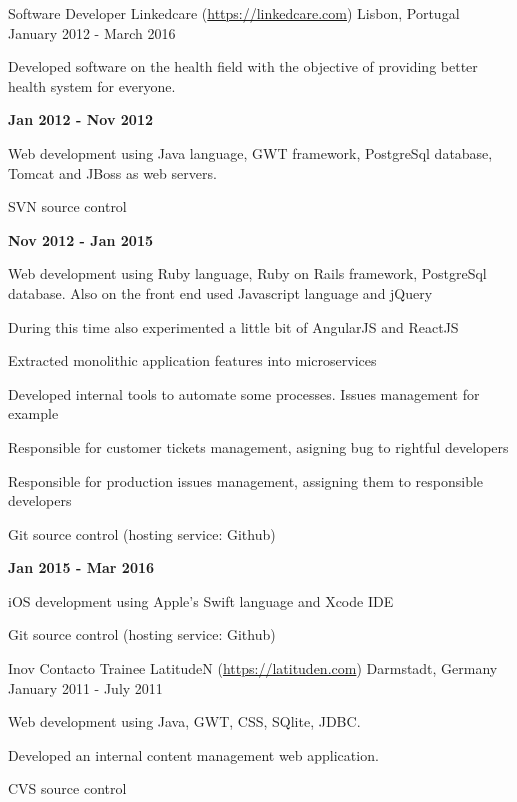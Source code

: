 \begin{cventries}
  \cventry
	{Software Developer} %
    {Linkedcare (\url{https://linkedcare.com}) } %
	{Lisbon, Portugal} %
	{January 2012 - March 2016} %
	{
	 \begin{cvitems} %
	 	\item {Developed software on the health field with the objective of providing better health system for everyone.}
	 	\item{\textbf{Jan 2012 - Nov 2012}}
	 	\item{Web development using Java language, GWT framework, PostgreSql database, Tomcat and JBoss as web servers.}
	 	\item {SVN source control}
	 	\item{\textbf{Nov 2012 - Jan 2015}}
	 	\item{Web development using Ruby language, Ruby on Rails framework, PostgreSql database. Also on the front end used Javascript language and jQuery}
	 	\item{During this time also experimented a little bit of AngularJS and ReactJS}
	 	\item{Extracted monolithic application features into microservices}
	 	\item{Developed internal tools to automate some processes. Issues management for example}
	 	\item{Responsible for customer tickets management, asigning bug to rightful developers}
	 	\item{Responsible for production issues management, assigning them to responsible developers}
	 	\item {Git source control (hosting service: Github)}
	 	\item{\textbf{Jan 2015 - Mar 2016}}
	 	\item{iOS development using Apple's Swift language and Xcode IDE}
	 	\item {Git source control (hosting service: Github)}
	\end{cvitems}
	}

  \cventry
    {Inov Contacto Trainee } %
    {LatitudeN (\url{https://latituden.com}) } %
    {Darmstadt, Germany} %
    {January 2011 - July 2011} %
    {
	\begin{cvitems} %
      	\item {Web development using Java, GWT, CSS, SQlite, JDBC.}
		\item {Developed an internal content management web application.}
		\item {CVS source control}
	\end{cvitems}
}

\end{cventries}
